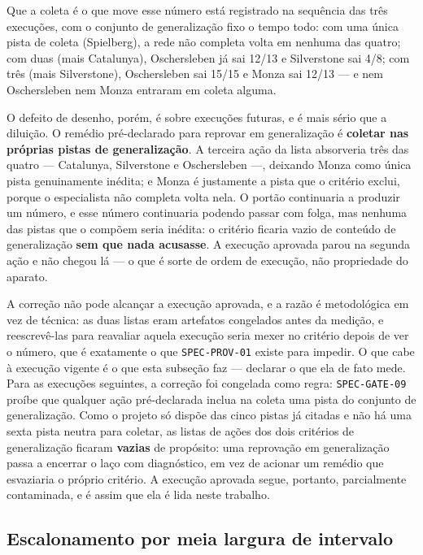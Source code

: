 Que a coleta é o que move esse número está registrado na sequência das três
execuções, com o conjunto de generalização fixo o tempo todo: com uma única pista
de coleta (Spielberg), a rede não completa volta em nenhuma das quatro; com duas
(mais Catalunya), Oschersleben já sai 12/13 e Silverstone sai 4/8; com três (mais
Silverstone), Oschersleben sai 15/15 e Monza sai 12/13 --- e nem Oschersleben nem
Monza entraram em coleta alguma.

O defeito de desenho, porém, é sobre execuções futuras, e é mais sério que a
diluição. O remédio pré-declarado para reprovar em generalização é
\textbf{coletar nas próprias pistas de generalização}. A terceira ação da lista
absorveria três das quatro --- Catalunya, Silverstone e Oschersleben ---,
deixando Monza como única pista genuinamente inédita; e Monza é justamente a
pista que o critério exclui, porque o especialista não completa volta nela. O
portão continuaria a produzir um número, e esse número continuaria podendo passar
com folga, mas nenhuma das pistas que o compõem seria inédita: o critério ficaria
vazio de conteúdo de generalização \textbf{sem que nada acusasse}. A execução
aprovada parou na segunda ação e não chegou lá --- o que é sorte de ordem de
execução, não propriedade do aparato.

A correção não pode alcançar a execução aprovada, e a razão é metodológica em
vez de técnica: as duas listas eram artefatos congelados antes da medição, e
reescrevê-las para reavaliar aquela execução seria mexer no critério depois de
ver o número, que é exatamente o que \texttt{SPEC-PROV-01} existe para impedir.
O que cabe à execução vigente é o que esta subseção faz --- declarar o que ela de
fato mede. Para as execuções seguintes, a correção foi congelada como regra:
\texttt{SPEC-GATE-09} proíbe que qualquer ação pré-declarada inclua na coleta
uma pista do conjunto de generalização. Como o projeto só dispõe das cinco
pistas já citadas e não há uma sexta pista neutra para coletar, as listas de
ações dos dois critérios de generalização ficaram \textbf{vazias} de propósito:
uma reprovação em generalização passa a encerrar o laço com diagnóstico, em vez
de acionar um remédio que esvaziaria o próprio critério. A execução aprovada
segue, portanto, parcialmente contaminada, e é assim que ela é lida neste
trabalho.

\subsection{Escalonamento por meia largura de intervalo}

